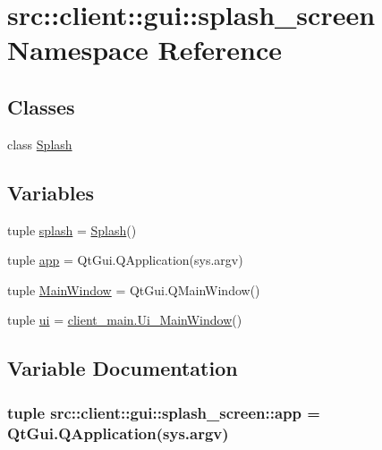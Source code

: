 \hypertarget{namespacesrc_1_1client_1_1gui_1_1splash__screen}{
\section{src::client::gui::splash\_\-screen Namespace Reference}
\label{namespacesrc_1_1client_1_1gui_1_1splash__screen}
}
\subsection*{Classes}
\begin{DoxyCompactItemize}
\item 
class \hyperlink{classsrc_1_1client_1_1gui_1_1splash__screen_1_1Splash}{Splash}
\end{DoxyCompactItemize}
\subsection*{Variables}
\begin{DoxyCompactItemize}
\item 
tuple \hyperlink{namespacesrc_1_1client_1_1gui_1_1splash__screen_af95af111820af72f3d99c2b39ba0bd31}{splash} = \hyperlink{classsrc_1_1client_1_1gui_1_1splash__screen_1_1Splash}{Splash}()
\item 
tuple \hyperlink{namespacesrc_1_1client_1_1gui_1_1splash__screen_ae96d4d23e1e08d3ad55e28d60d1911c9}{app} = QtGui.QApplication(sys.argv)
\item 
tuple \hyperlink{namespacesrc_1_1client_1_1gui_1_1splash__screen_a4f55ad57577419ddc7b97392048b7ffd}{MainWindow} = QtGui.QMainWindow()
\item 
tuple \hyperlink{namespacesrc_1_1client_1_1gui_1_1splash__screen_a437e74b30a8d13f598dab0b047c644f9}{ui} = \hyperlink{classsrc_1_1client_1_1gui_1_1client__main_1_1Ui__MainWindow}{client\_\-main.Ui\_\-MainWindow}()
\end{DoxyCompactItemize}


\subsection{Variable Documentation}
\hypertarget{namespacesrc_1_1client_1_1gui_1_1splash__screen_ae96d4d23e1e08d3ad55e28d60d1911c9}{
\subsubsection[{app}]{\setlength{\rightskip}{0pt plus 5cm}tuple {\bf src::client::gui::splash\_\-screen::app} = QtGui.QApplication(sys.argv)}}
\label{namespacesrc_1_1client_1_1gui_1_1splash__screen_ae96d4d23e1e08d3ad55e28d60d1911c9}


